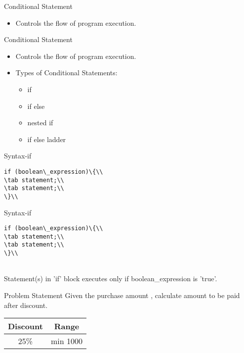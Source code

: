 \documentclass[aspectratio=169,14pt,usenames,dvipsnames]{beamer}
\newcommand\tab[1][1cm]{\hspace*{#1}}
\begin{document}
\begin{frame}{Conditional Statement}
\begin{itemize}
    \item Controls the flow of program execution.
\end{itemize}
\end{frame}

\begin{frame}{Conditional Statement}
\begin{itemize}
    \item Controls the flow of program execution.
    \item Types of Conditional Statements:
    \begin{itemize}
        \item if
        \item if else
        \item nested if
        \item if else ladder
    \end{itemize}
\end{itemize}
\end{frame}


\begin{frame}{Syntax-if}
\begin{lstlisting}
if (boolean\_expression)\{\\
\tab statement;\\
\tab statement;\\
\}\\
\end{lstlisting}
\end{frame}

\begin{frame}{Syntax-if}
\begin{lstlisting}
if (boolean\_expression)\{\\
\tab statement;\\
\tab statement;\\
\}\\
\end{lstlisting}\\
Statement(s) in 'if' block executes only if boolean\_expression is 'true'.
\end{frame}

\begin{frame}{Problem Statement}
Given the purchase amount , calculate amount to be paid after discount.\\
\begin{center}
\begin{tabular}{|c|c|}
\hline
\textbf{Discount} & \textbf{Range} \\
\hline
25\% & min 1000\\
\hline
\end{tabular}
\end{center}
\end{frame}
\end{document}
